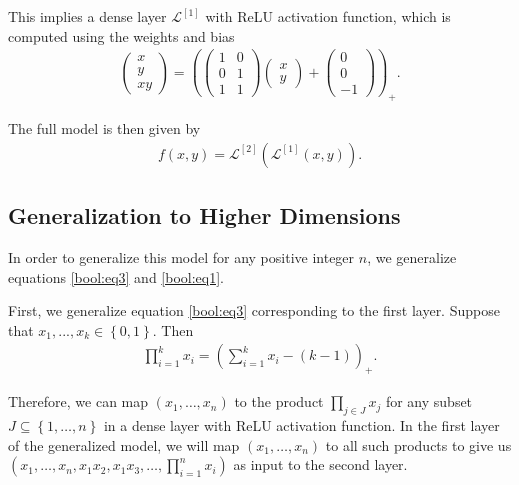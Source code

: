 \documentclass{somasmsc}
\begin{document}
This implies a dense layer $\mathcal{L}^{\left[1\right]}$ with ReLU activation function, which is computed using the weights and bias
\begin{align} \label{bool:eq4}
\begin{pmatrix}
    x \\
    y \\
    xy
\end{pmatrix}
=
\left(
\begin{pmatrix}
    1 & 0 \\
    0 & 1 \\
    1 & 1
\end{pmatrix}
\begin{pmatrix}
    x \\
    y
\end{pmatrix}
+
\begin{pmatrix}
    0 \\
    0 \\
    -1
\end{pmatrix}
\right)_+.
\end{align}

The full model is then given by
\begin{align*}
f(x, y) = \mathcal{L}^{\left[2\right]}\left(\mathcal{L}^{\left[1\right]}\left(x, y\right)\right).
\end{align*}

\subsection{Generalization to Higher Dimensions}\label{bool:gen}

In order to generalize this model for any positive integer $n$, we generalize equations \ref{bool:eq3} and \ref{bool:eq1}.

First, we generalize equation \ref{bool:eq3} corresponding to the first layer. Suppose that $x_1, ..., x_k \in \left\{0, 1\right\}$. Then
\begin{align}\label{bool:eq5}
\prod_{i=1}^{k} x_i = \left(\sum_{i=1}^{k} x_i - \left(k - 1\right)\right)_+.
\end{align}

Therefore, we can map $\left(x_1, \dots, x_n\right)$ to the product $\prod_{j \in J} x_j$ for any subset $J \subseteq \left\{1, \dots, n\right\}$ in a dense layer with ReLU activation function. In the first layer of the generalized model, we will map $\left(x_1, \dots, x_n\right)$ to all such products to give us $\left(x_1, \dots, x_n, x_1x_2, x_1x_3, \dots, \prod_{i=1}^n x_i\right)$ as input to the second layer.
\end{document}
